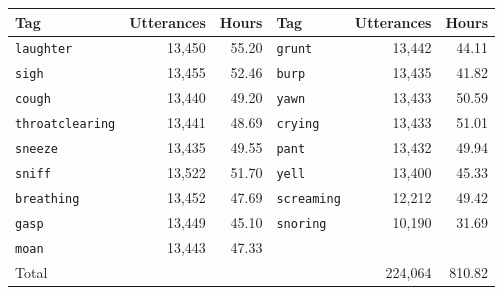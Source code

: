 \small
\begin{tabular}{lrr|lrr}
\toprule
Tag & Utterances & Hours & Tag & Utterances & Hours \\
\midrule
\texttt{laughter}       & 13,450 & 55.20 & \texttt{grunt}     & 13,442 & 44.11 \\
\texttt{sigh}           & 13,455 & 52.46 & \texttt{burp}      & 13,435 & 41.82 \\
\texttt{cough}          & 13,440 & 49.20 & \texttt{yawn}      & 13,433 & 50.59 \\
\texttt{throatclearing} & 13,441 & 48.69 & \texttt{crying}    & 13,433 & 51.01 \\
\texttt{sneeze}         & 13,435 & 49.55 & \texttt{pant}      & 13,432 & 49.94 \\
\texttt{sniff}          & 13,522 & 51.70 & \texttt{yell}      & 13,400 & 45.33 \\
\texttt{breathing}      & 13,452 & 47.69 & \texttt{screaming} & 12,212 & 49.42 \\
\texttt{gasp}           & 13,449 & 45.10 & \texttt{snoring}   & 10,190 & 31.69 \\
\texttt{moan}           & 13,443 & 47.33 & & & \\
\midrule
\multicolumn{4}{l}{Total} & 224,064 & 810.82 \\
\bottomrule
\end{tabular}
